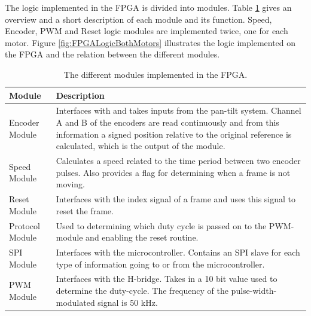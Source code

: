 \documentclass[../../main.tex]{subfiles}
\begin{document}
The logic implemented in the FPGA is divided into modules. Table \ref{tab:FPGAModulesDescription} gives an overview and a short description of each module and its function. Speed, Encoder, PWM and Reset logic modules are implemented twice, one for each motor. Figure \ref{fig:FPGALogicBothMotors} illustrates the logic implemented on the FPGA and the relation between the different modules.     
\begin{table}[]
    \centering
    
    \begin{tabular}{l|p{}} %
        Module & Description \\
        \hline
        Encoder Module & Interfaces with and takes inputs from the pan-tilt system. Channel A and B of the encoders are read continuously and from this information a signed position relative to the original reference is calculated, which is the output of the module. \\
        \hline
        Speed Module & Calculates a speed related to the time period between two encoder pulses. Also provides a flag for determining when a frame is not moving.\\
        \hline
        Reset Module & Interfaces with the index signal of a frame and uses this signal to reset the frame. \\
        \hline
        Protocol Module & Used to determining which duty cycle is passed on to the PWM-module and enabling the reset routine. \\
        \hline
        SPI Module & Interfaces with the microcontroller. Contains an SPI slave for each type of information going to or from the microcontroller. \\
        \hline
        PWM Module & Interfaces with the H-bridge. Takes in a 10 bit value used to determine the duty-cycle. The frequency of the pulse-width-modulated signal is 50 kHz.
    \end{tabular}    
    
    \caption{The different modules implemented in the FPGA.}
    \label{tab:FPGAModulesDescription}
\end{table}
\end{document}
